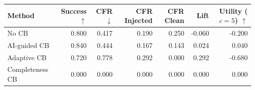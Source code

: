 \begin{tabular}{lrrrrrr}
\toprule
Method & Success $\uparrow$ & CFR $\downarrow$ & CFR Injected & CFR Clean & Lift & Utility ($c=5$) $\uparrow$ \\
\midrule
No CB & 0.800 & 0.417 & 0.190 & 0.250 & -0.060 & -0.200 \\
AI-guided CB & 0.840 & 0.444 & 0.167 & 0.143 & 0.024 & 0.040 \\
Adaptive CB & 0.720 & 0.778 & 0.292 & 0.000 & 0.292 & -0.680 \\
Completeness CB & 0.000 & 0.000 & 0.000 & 0.000 & 0.000 & 0.000 \\
\bottomrule
\end{tabular}
